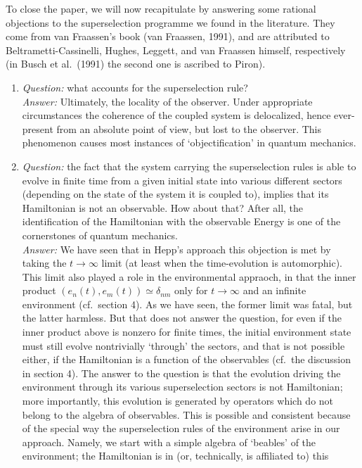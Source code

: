 \documentclass[12pt,titlepage]{article}
\newcommand{\dl}{\delta}
\newcommand{\raw}{\rightarrow}
\begin{document}
 To close the paper, we will now recapitulate by answering some rational
objections to the
superselection programme we found in the literature. They come from van
Fraassen's
book (van Fraassen, 1991), and are attributed to Beltrametti-Cassinelli,
Hughes, Leggett, and van
Fraassen himself, respectively (in  Busch et al.\ (1991) the second one is
ascribed to Piron).
\begin{enumerate}
\item {\em Question:} what accounts for the superselection rule?\\ {\em
Answer:} Ultimately, the
locality of the observer. Under appropriate circumstances the coherence of the
coupled system is
delocalized, hence ever-present from an absolute point of view, but lost to the
observer.
This phenomenon causes most instances of `objectification' in quantum
mechanics.
 \item {\em
Question:} the fact that the system carrying the superselection rules is able
to evolve in finite
time from a given initial state into various different sectors (depending on
the state of the system
it is coupled to), implies that its Hamiltonian is not an observable. How about
that? After all, the
identification of the Hamiltonian  with the observable Energy is one of the
cornerstones of quantum
mechanics.\\
 {\em Answer:} We have seen that in Hepp's approach this objection is met by
taking the
$t\raw\infty$ limit (at least when the time-evolution is automorphic).  This
limit also played a role
in the environmental appraoch, in that the inner product $(e_n(t),e_m(t))\simeq
\dl_{nm}$ only for
$t\raw \infty$ and an infinite environment (cf.\ section 4). As we have seen,
the former limit was
fatal, but the latter harmless. But that does not answer the question, for even
if the inner product
above is nonzero for finite times, the initial environment state  must still
evolve nontrivially
`through' the sectors, and that is not possible either, if the Hamiltonian is a
function of the
observables (cf.\ the discussion in section 4). The answer to the question is
that the
evolution driving the environment through its various superselection sectors is
  not  Hamiltonian;
more importantly, this evolution is generated by operators which do not belong
to the algebra of
observables.
 This is possible and consistent because of the special way the superselection
rules of
the environment arise in our approach. Namely, we start with a simple algebra
of `beables' of the
environment; the Hamiltonian is in (or, technically, is affiliated to) this

\end{enumerate}
\end{document}
